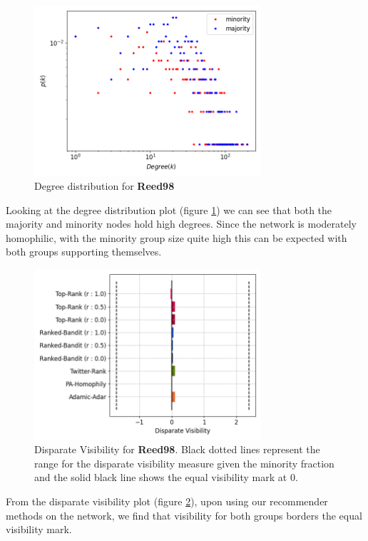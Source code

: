 \begin{figure}
	\centering
	\includegraphics[trim=0 10 0 10, clip, width=0.75\textwidth]{images/dd_reed.png}
	\caption{Degree distribution for \textbf{Reed98}}
	\label{dd_reed}
\end{figure}

Looking at the degree distribution plot (figure \ref{dd_reed}) we can see that both the majority and minority nodes hold high degrees. Since the network is moderately homophilic, with the minority group size quite high this can be expected with both groups supporting themselves. 

\begin{figure}
	\centering
	\includegraphics[trim=0 10 0 10, clip, width=0.75\textwidth]{images/dv_reed.png}
	\caption{Disparate Visibility for \textbf{Reed98}. Black dotted lines represent the range for the disparate visibility measure given the minority fraction and the solid black line shows the equal visibility mark at 0.}
	\label{dv_reed}
\end{figure}

From the disparate visibility plot (figure \ref{dv_reed}), upon using our recommender methods on the network, we find that visibility for both groups borders the equal visibility mark. 

